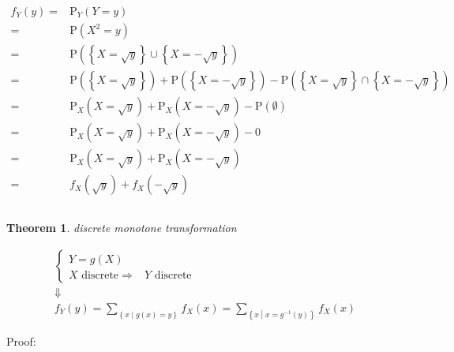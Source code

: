 \documentclass[
]{book}
\newtheorem{theorem}{Theorem}[chapter]
\theoremstyle{definition}
\theoremstyle{definition}
\theoremstyle{definition}
\theoremstyle{definition}
\theoremstyle{remark}
\begin{document}
\[
\begin{aligned}
f_{{\scriptscriptstyle Y}}\left(y\right)= & \mathrm{P}_{{\scriptscriptstyle Y}}\left(Y=y\right)\\
= & \mathrm{P}\left(X^{2}=y\right)\\
= & \mathrm{P}\left(\left\{ X=\sqrt{y}\right\} \cup\left\{ X=-\sqrt{y}\right\} \right)\\
= & \mathrm{P}\left(\left\{ X=\sqrt{y}\right\} \right)+\mathrm{P}\left(\left\{ X=-\sqrt{y}\right\} \right)-\mathrm{P}\left(\left\{ X=\sqrt{y}\right\} \cap\left\{ X=-\sqrt{y}\right\} \right)\\
= & \mathrm{P}_{{\scriptscriptstyle X}}\left(X=\sqrt{y}\right)+\mathrm{P}_{{\scriptscriptstyle X}}\left(X=-\sqrt{y}\right)-\mathrm{P}\left(\emptyset\right)\\
= & \mathrm{P}_{{\scriptscriptstyle X}}\left(X=\sqrt{y}\right)+\mathrm{P}_{{\scriptscriptstyle X}}\left(X=-\sqrt{y}\right)-0\\
= & \mathrm{P}_{{\scriptscriptstyle X}}\left(X=\sqrt{y}\right)+\mathrm{P}_{{\scriptscriptstyle X}}\left(X=-\sqrt{y}\right)\\
= & f_{{\scriptscriptstyle X}}\left(\sqrt{y}\right)+f_{{\scriptscriptstyle X}}\left(-\sqrt{y}\right)
\end{aligned}
\]

\[
\tag*{$\Box$}
\]

\begin{theorem}
\protect\hypertarget{thm:unnamed-chunk-16}{}\label{thm:unnamed-chunk-16}discrete monotone transformation
\end{theorem}

\[
\begin{array}{c}
\begin{cases}
Y=g\left(X\right)\\
X\text{ discrete}\Rightarrow & Y\text{ discrete}
\end{cases}\\
\Downarrow\\
f_{{\scriptscriptstyle Y}}\left(y\right)=\sum\limits _{\left\{ x\middle|g\left(x\right)=y\right\} }f_{{\scriptscriptstyle X}}\left(x\right)=\sum\limits _{\left\{ x\middle|x=g^{-1}\left(y\right)\right\} }f_{{\scriptscriptstyle X}}\left(x\right)
\end{array}
\]

Proof:
\end{document}
